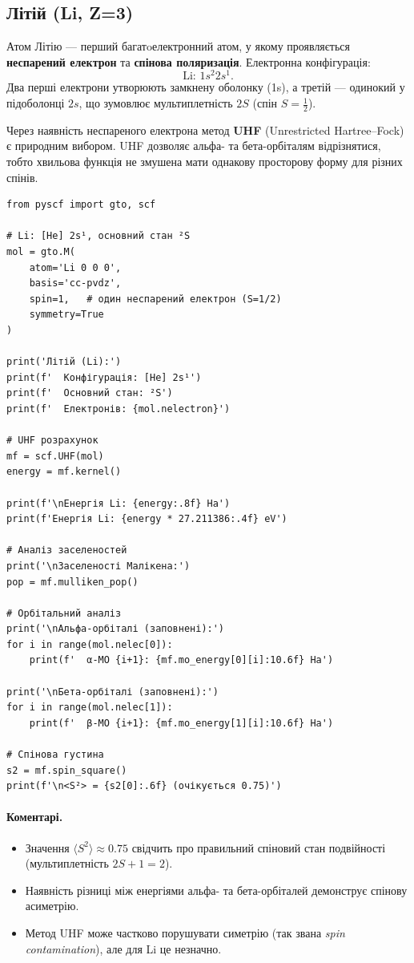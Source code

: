 \subsection{Літій (Li, Z=3)}

Атом Літію --- перший багатoелектронний атом, у якому проявляється \textbf{неспарений електрон} та \textbf{спінова поляризація}.
Електронна конфігурація:
\[
    \text{Li: } 1s^2 2s^1.
\]
Два перші електрони утворюють замкнену оболонку (1s), а третій --- одинокий у підоболонці \(2s\), що зумовлює мультиплетність \(2S\) (спін \(S = \frac{1}{2}\)).

Через наявність неспареного електрона метод \textbf{UHF} (Unrestricted Hartree–Fock) є природним вибором.
UHF дозволяє альфа- та бета-орбіталям відрізнятися, тобто хвильова функція не змушена мати однакову просторову форму для різних спінів.

\begin{verbatim}
from pyscf import gto, scf

# Li: [He] 2s¹, основний стан ²S
mol = gto.M(
    atom='Li 0 0 0',
    basis='cc-pvdz',
    spin=1,   # один неспарений електрон (S=1/2)
    symmetry=True
)

print('Літій (Li):')
print(f'  Конфігурація: [He] 2s¹')
print(f'  Основний стан: ²S')
print(f'  Електронів: {mol.nelectron}')

# UHF розрахунок
mf = scf.UHF(mol)
energy = mf.kernel()

print(f'\nЕнергія Li: {energy:.8f} Ha')
print(f'Енергія Li: {energy * 27.211386:.4f} eV')

# Аналіз заселеностей
print('\nЗаселеності Малікена:')
pop = mf.mulliken_pop()

# Орбітальний аналіз
print('\nАльфа-орбіталі (заповнені):')
for i in range(mol.nelec[0]):
    print(f'  α-MO {i+1}: {mf.mo_energy[0][i]:10.6f} Ha')

print('\nБета-орбіталі (заповнені):')
for i in range(mol.nelec[1]):
    print(f'  β-MO {i+1}: {mf.mo_energy[1][i]:10.6f} Ha')

# Спінова густина
s2 = mf.spin_square()
print(f'\n<S²> = {s2[0]:.6f} (очікується 0.75)')
\end{verbatim}

\paragraph{Коментарі.}
\begin{itemize}
    \item Значення \(\langle S^2 \rangle \approx 0.75\) свідчить про правильний спіновий стан подвійності (мультиплетність \(2S+1=2\)).
    \item Наявність різниці між енергіями альфа- та бета-орбіталей демонструє спінову асиметрію.
    \item Метод UHF може частково порушувати симетрію (так звана \textit{spin contamination}), але для Li це незначно.
\end{itemize}

